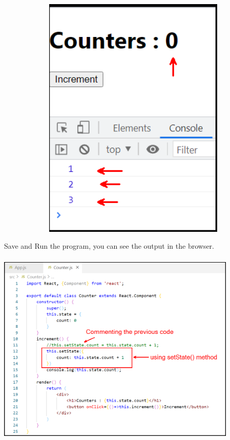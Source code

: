 \documentclass{article}
\begin{document}
\begin{center}
	\noindent \includegraphics*[width=5.89in, height=4.62in]{IMG-09-39}
\end{center}

\noindent 
\newpage
\noindent 
Save and Run the program, you can see the output in the browser.

\begin{center}
	\noindent \includegraphics*[width=4.51in, height=3.68in]{IMG-09-40}
\end{center}

\noindent 

\noindent 
\end{document}
